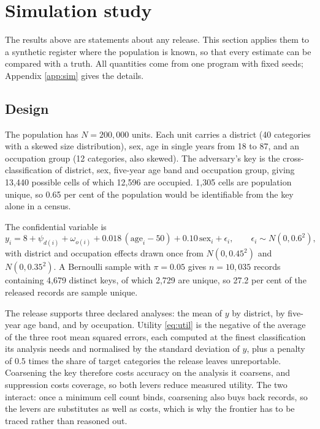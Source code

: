 \documentclass[11pt,a4paper]{article}
\theoremstyle{plain}
\theoremstyle{definition}
\begin{document}
\section{Simulation study}\label{sec:sim}

The results above are statements about any release. This section applies them
to a synthetic register where the population is known, so that every estimate
can be compared with a truth. All quantities come from one program with
fixed seeds; Appendix \ref{app:sim} gives the details.

\subsection{Design}

The population has $N = 200{,}000$ units. Each unit carries a district (40
categories with a skewed size distribution), sex, age in single years from 18
to 87, and an occupation group (12 categories, also skewed). The adversary's
key is the cross-classification of district, sex, five-year age band and
occupation group, giving 13,440 possible cells of which 12,596 are occupied.
1,305 cells are population unique, so 0.65 per cent of the population would be
identifiable from the key alone in a census.

The confidential variable is
\begin{equation}
y_i = 8 + \psi_{d(i)} + \omega_{o(i)} + 0.018\,(\mathrm{age}_i - 50)
+ 0.10\,\mathrm{sex}_i + \epsilon_i , \qquad
\epsilon_i \sim N(0, 0.6^2) ,
\end{equation}
with district and occupation effects drawn once from $N(0, 0.45^2)$ and
$N(0, 0.35^2)$. A Bernoulli sample with $\pi = 0.05$ gives $n = 10{,}035$
records containing 4,679 distinct keys, of which 2,729 are unique, so 27.2 per
cent of the released records are sample unique.

The release supports three declared analyses: the mean of $y$ by district, by
five-year age band, and by occupation. Utility \eqref{eq:util} is the negative
of the average of the three root mean squared errors, each computed at the
finest classification its analysis needs and normalised by the standard
deviation of $y$, plus a penalty of $0.5$ times the share of target categories
the release leaves unreportable. Coarsening the key therefore costs accuracy on the analysis it coarsens, and
suppression costs coverage, so both levers reduce measured utility. The two interact: once
a minimum cell count binds, coarsening also buys back records, so the levers are
substitutes as well as costs, which is why the frontier has to be traced rather
than reasoned out.
\end{document}
